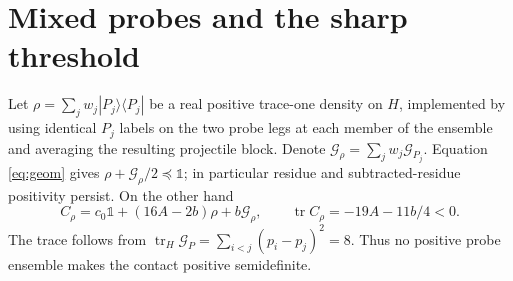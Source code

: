 \documentclass[11pt]{article}
\newcommand{\tr}{\operatorname{tr}}
\newcommand{\I}{\mathbb 1}
\begin{document}
\section{Mixed probes and the sharp threshold}
Let $\rho=\sum_jw_j|P_j\rangle\langle P_j|$ be a real positive trace-one
density on $H$, implemented by using identical $P_j$ labels on the two
probe legs at each member of the ensemble and averaging the resulting
projectile block. Denote $\mathcal G_\rho=\sum_jw_j\mathcal G_{P_j}$.
Equation \eqref{eq:geom} gives $\rho+\mathcal G_\rho/2\preceq\I$;
in particular residue and subtracted-residue positivity persist.
On the other hand
\begin{equation}
 C_\rho=c_0\I+(16A-2b)\rho+b\mathcal G_\rho,\qquad
 \tr C_\rho=-19A-11b/4<0.
\end{equation}
The trace follows from $\tr_H\mathcal G_P=\sum_{i<j}(p_i-p_j)^2=8$.
Thus no positive probe ensemble makes the contact positive semidefinite.
\end{document}
